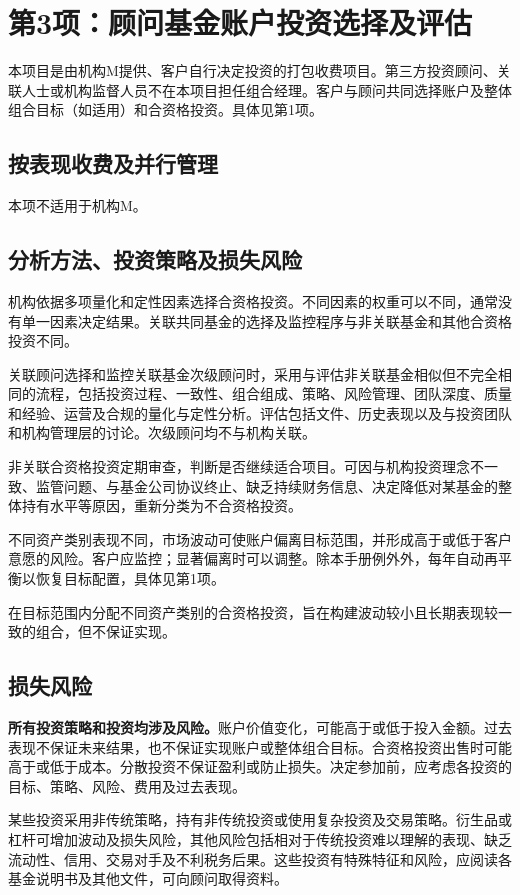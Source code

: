 \documentclass[UTF8,fontset=none,11pt,a4paper]{ctexart}
\begin{document}
\section*{第3项：顾问基金账户投资选择及评估}
本项目是由机构M提供、客户自行决定投资的打包收费项目。第三方投资顾问、关联人士或机构监督人员不在本项目担任组合经理。客户与顾问共同选择账户及整体组合目标（如适用）和合资格投资。具体见\allowbreak\mbox{第1项。}


\subsection*{按表现收费及并行管理}
本项不适用于机构M。


\subsection*{分析方法、投资策略及损失风险}
机构依据多项量化和定性因素选择合资格投资。不同因素的权重可以不同，通常没有单一因素决定结果。关联共同基金的选择及监控程序与非关联基金和其他合资格\allowbreak\mbox{投资不同。}


关联顾问选择和监控关联基金次级顾问时，采用与评估非关联基金相似但不完全相同的流程，包括投资过程、一致性、组合组成、策略、风险管理、团队深度、质量和经验、运营及合规的量化与定性分析。评估包括文件、历史表现以及与投资团队和机构管理层的讨论。次级顾问均不与\allowbreak\mbox{机构关联。}


非关联合资格投资定期审查，判断是否继续适合项目。可因与机构投资理念不一致、监管问题、与基金公司协议终止、缺乏持续财务信息、决定降低对某基金的整体持有水平等原因，重新分类为不合\allowbreak\mbox{资格投资。}


不同资产类别表现不同，市场波动可使账户偏离目标范围，并形成高于或低于客户意愿的风险。客户应监控；显著偏离时可以调整。除本手册例外外，每年自动再平衡以恢复目标配置，具体见\allowbreak\mbox{第1项。}


在目标范围内分配不同资产类别的合资格投资，旨在构建波动较小且长期表现较一致的组合，但不\allowbreak\mbox{保证实现。}


\subsection*{损失风险}
\textbf{所有投资策略和投资均涉及风险。}账户价值变化，可能高于或低于投入金额。过去表现不保证未来结果，也不保证实现账户或整体组合目标。合资格投资出售时可能高于或低于成本。分散投资不保证盈利或防止损失。决定参加前，应考虑各投资的目标、策略、风险、费用及\allowbreak\mbox{过去表现。}


某些投资采用非传统策略，持有非传统投资或使用复杂投资及交易策略。衍生品或杠杆可增加波动及损失风险，其他风险包括相对于传统投资难以理解的表现、缺乏流动性、信用、交易对手及不利税务后果。这些投资有特殊特征和风险，应阅读各基金说明书及其他文件，可向顾问\allowbreak\mbox{取得资料。}
\end{document}
